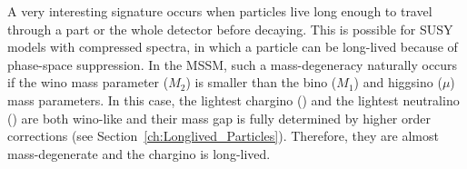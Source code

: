 


A very interesting signature occurs when particles live long enough to travel through a part or the whole detector before decaying.
This is possible for SUSY models with compressed spectra, in which a particle can be long-lived because of phase-space suppression.
In the MSSM, such a mass-degeneracy naturally occurs if the wino mass parameter ($M_2$) is smaller than the bino ($M_1$) and higgsino ($\mu$) mass parameters.
In this case, the lightest chargino (\chipm) and the lightest neutralino (\chiO) are both wino-like and their mass gap is fully determined by higher order corrections (see Section~\ref{ch:Longlived_Particles}). 
Therefore, they are almost mass-degenerate and the chargino is long-lived.

